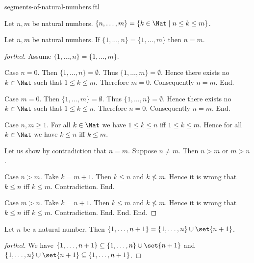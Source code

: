 \documentclass{naproche-library}
\begin{document}
\begin{smodule}[title=Segments of the Natural Numbers]{segments-of-natural-numbers.ftl}

\begin{definition}[forthel,id=FOUNDATIONS_14_3625613501923328]
  Let $n, m$ be natural numbers.
  $\{ n, \dots, m \} = \{ k \in \Nat \mid n \leq k \leq m \}$.
\end{definition}

\begin{proposition}[forthel,id=FOUNDATIONS_14_145331933151232]
  Let $n, m$ be natural numbers.
  If $\{ 1, \dots, n \} = \{ 1, \dots, m \}$ then $n = m$.
\end{proposition}
\begin{proof}[forthel]
  Assume $\{ 1, \dots, n \} = \{ 1, \dots, m \}$.

  Case $n = 0$.
    Then $\{ 1, \dots, n \} = \emptyset$.
    Thus $\{ 1, \dots, m \} = \emptyset$.
    Hence there exists no $k \in \Nat$ such that $1 \leq k \leq m$.
    Therefore $m = 0$.
    Consequently $n = m$.
  End.

  Case $m = 0$.
    Then $\{ 1, \dots, m \} = \emptyset$.
    Thus $\{ 1, \dots, n \} = \emptyset$.
    Hence there exists no $k \in \Nat$ such that $1 \leq k \leq n$.
    Therefore $n = 0$.
    Consequently $n = m$.
  End.

  Case $n, m \geq 1$.
    For all $k \in \Nat$ we have $1 \leq k \leq n$ iff $1 \leq k \leq m$.
    Hence for all $k \in \Nat$ we have $k \leq n$ iff $k \leq m$.

    Let us show by contradiction that $n = m$.
      Suppose $n \neq m$.
      Then $n > m$ or $m > n$.

      Case $n > m$.
        Take $k = m + 1$.
        Then $k \leq n$ and $k \nleq m$.
        Hence it is wrong that $k \leq n$ iff $k \leq m$.
        Contradiction.
      End.

      Case $m > n$.
        Take $k = n + 1$.
        Then $k \leq m$ and $k \nleq m$.
        Hence it is wrong that $k \leq n$ iff $k \leq m$.
        Contradiction.
      End.
    End.
  End.
\end{proof}

\begin{proposition}[forthel,id=FOUNDATIONS_14_658708738605056]
  Let $n$ be a natural number.
  Then $\{ 1, \dots, n + 1 \} = \{ 1, \dots, n \} \cup \set{n + 1}$.
\end{proposition}
\begin{proof}[forthel]
  We have
  $\{ 1, \dots, n + 1 \} \subseteq \{ 1, \dots, n \} \cup \set{n + 1}$ and $\{ 1, \dots, n \} \cup \set{n + 1} \subseteq \{ 1, \dots, n + 1 \}$.
\end{proof}
\end{smodule}
\end{document}
